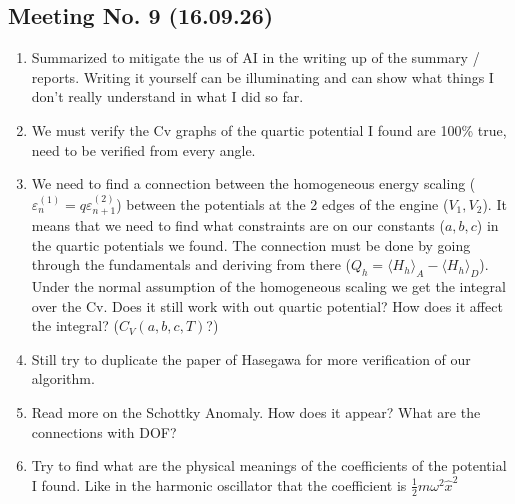 \documentclass{article}
\numberwithin{equation}{subsection}
\begin{document}
\subsection*{Meeting No. 9 (16.09.26)}
\begin{enumerate}[label=\textbf{\Alph*.}]
    \item Summarized to mitigate the us of AI in the writing up of the summary / reports. Writing it yourself can be illuminating and can show what things I don't really understand in what I did so far.
    \item We must verify the Cv graphs of the quartic potential I found are 100\% true, need to be verified from every angle.
    \item We need to find a connection between the homogeneous energy scaling ($\varepsilon_{n}^{(1)}=q \varepsilon_{n+1}^{(2)}$) between the potentials at the 2 edges of the engine ($V_1, V_2$). It means that we need to find what constraints are on our constants ($a,b,c$) in the quartic potentials we found. The connection must be done by going through the fundamentals and deriving from there ($Q_h = \langle H_h \rangle_A - \langle H_h \rangle_D$). Under the normal assumption of the homogeneous scaling we get the integral over the Cv. Does it still work with out quartic potential? How does it affect the integral? ($C_V(a,b,c,T)$?)
    \item Still try to duplicate the paper of Hasegawa for more verification of our algorithm.
    \item Read more on the Schottky Anomaly. How does it appear? What are the connections with DOF?
    \item Try to find what are the physical meanings of the coefficients of the potential I found. Like in the harmonic oscillator that the coefficient is $\frac{1}{2}m\omega^2\hat{x}^2$
\end{enumerate}
\end{document}
